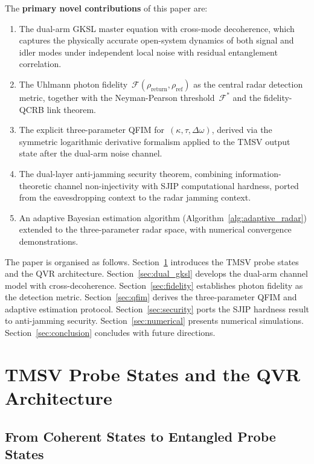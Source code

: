 \documentclass[journal]{IEEEtran}
\begin{document}
The \textbf{primary novel contributions} of this paper are:
\begin{enumerate}
    \item The dual-arm GKSL master equation with cross-mode decoherence, which captures the physically accurate open-system dynamics of both signal and idler modes under independent local noise with residual entanglement correlation.
    \item The Uhlmann photon fidelity~$\mathcal{F}(\rho_{\text{return}}, \rho_{\text{ref}})$ as the central radar detection metric, together with the Neyman-Pearson threshold~$\mathcal{F}^{*}$ and the fidelity-QCRB link theorem.
    \item The explicit three-parameter QFIM for~$(\kappa, \tau, \Delta\omega)$, derived via the symmetric logarithmic derivative formalism applied to the TMSV output state after the dual-arm noise channel.
    \item The dual-layer anti-jamming security theorem, combining information-theoretic channel non-injectivity with SJIP computational hardness, ported from the eavesdropping context to the radar jamming context.
    \item An adaptive Bayesian estimation algorithm (Algorithm~\ref{alg:adaptive_radar}) extended to the three-parameter radar space, with numerical convergence demonstrations.
\end{enumerate}

The paper is organised as follows. Section~\ref{sec:tmsv} introduces the TMSV probe states and the QVR architecture. Section~\ref{sec:dual_gksl} develops the dual-arm channel model with cross-decoherence. Section~\ref{sec:fidelity} establishes photon fidelity as the detection metric. Section~\ref{sec:qfim} derives the three-parameter QFIM and adaptive estimation protocol. Section~\ref{sec:security} ports the SJIP hardness result to anti-jamming security. Section~\ref{sec:numerical} presents numerical simulations. Section~\ref{sec:conclusion} concludes with future directions.


\section{TMSV Probe States and the QVR Architecture}\label{sec:tmsv}

\subsection{From Coherent States to Entangled Probe States}
\end{document}
